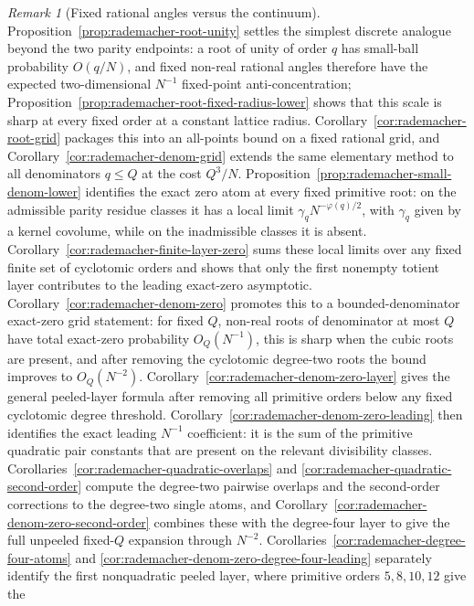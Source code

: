 \documentclass[11pt]{amsart}
\numberwithin{equation}{section}
\theoremstyle{definition}
\theoremstyle{remark}
\newtheorem{remark}[theorem]{Remark}
\begin{document}
\begin{remark}[Fixed rational angles versus the continuum]\label{rem:root-unity-lattice}
Proposition~\ref{prop:rademacher-root-unity} settles the simplest discrete
analogue beyond the two parity endpoints: a root of unity of order \(q\) has
small-ball probability \(O(q/N)\), and fixed non-real rational angles therefore
have the expected two-dimensional \(N^{-1}\) fixed-point anti-concentration;
Proposition~\ref{prop:rademacher-root-fixed-radius-lower} shows that this
scale is sharp at every fixed order at a constant lattice radius.
Corollary~\ref{cor:rademacher-root-grid} packages this into an all-points bound
on a fixed rational grid, and Corollary~\ref{cor:rademacher-denom-grid} extends
the same elementary method to all denominators \(q\le Q\) at the cost \(Q^3/N\).
Proposition~\ref{prop:rademacher-small-denom-lower} identifies the exact zero
atom at every fixed primitive root: on the admissible parity residue classes it
has a local limit \(\gamma_qN^{-\varphi(q)/2}\), with \(\gamma_q\) given by a
kernel covolume, while on the inadmissible classes it is absent.
Corollary~\ref{cor:rademacher-finite-layer-zero} sums these local limits over
any fixed finite set of cyclotomic orders and shows that only the first
nonempty totient layer contributes to the leading exact-zero asymptotic.
Corollary~\ref{cor:rademacher-denom-zero} promotes this to a bounded-denominator
exact-zero grid statement: for fixed \(Q\), non-real roots of denominator at most
\(Q\) have total exact-zero probability \(O_Q(N^{-1})\), this is sharp when the
cubic roots are present, and after removing the cyclotomic degree-two roots the
bound improves to \(O_Q(N^{-2})\).  Corollary~\ref{cor:rademacher-denom-zero-layer}
gives the general peeled-layer formula after removing all primitive orders below
any fixed cyclotomic degree threshold.  Corollary~\ref{cor:rademacher-denom-zero-leading}
then identifies the exact leading \(N^{-1}\) coefficient: it is the sum of the
primitive quadratic pair constants that are present on the relevant divisibility
classes.  Corollaries~\ref{cor:rademacher-quadratic-overlaps} and
\ref{cor:rademacher-quadratic-second-order} compute the degree-two pairwise
overlaps and the second-order corrections to the degree-two single atoms, and
Corollary~\ref{cor:rademacher-denom-zero-second-order} combines these with the
degree-four layer to give the full unpeeled fixed-\(Q\) expansion through
\(N^{-2}\).  Corollaries~\ref{cor:rademacher-degree-four-atoms} and
\ref{cor:rademacher-denom-zero-degree-four-leading} separately identify the
first nonquadratic peeled layer, where primitive orders \(5,8,10,12\) give the

\end{remark}
\end{document}
